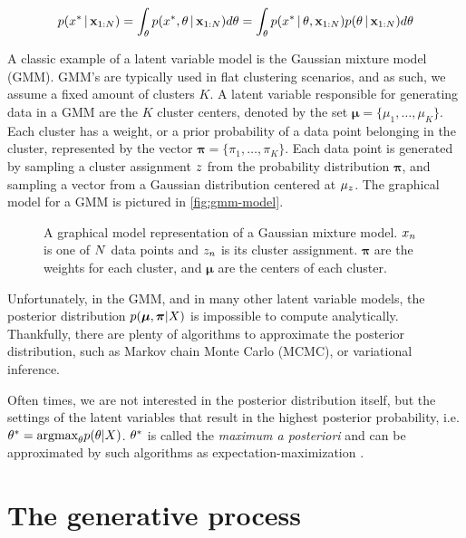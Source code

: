 \begin{align}
  p(x^* \,|\, \mathbf{x}_{1:N}) = \int_\theta p(x^*, \theta \,|\, \mathbf{x}_{1:N})d\theta =  \int_\theta p(x^* \,|\, \theta, \mathbf{x}_{1:N})p(\theta \,|\, \mathbf{x}_{1:N})d\theta
\end{align}


A classic example of a latent variable model
is the Gaussian mixture model (GMM).
GMM's are typically used in flat clustering scenarios,
and as such, we assume a fixed amount of clusters $K$.
A latent variable responsible for generating
data in a GMM are
the $K$ cluster centers, denoted by the set
$\bm{\mu} = \{\mu_1, \ldots, \mu_K\}$.
Each cluster has a weight, or a prior probability
of a data point belonging in the cluster,
represented by the vector $\bm{\pi} = \{\pi_1,\ldots,\pi_K\}$.
Each data point is generated by sampling a cluster
assignment $z$ from the probability distribution $\bm{\pi}$,
and sampling a vector from a Gaussian distribution
centered at $\mu_z$.
The graphical model for a GMM is pictured in \autoref{fig:gmm-model}.

\begin{figure}[H]
  \centering
  
  \caption{A graphical model representation of a Gaussian mixture model. $x_n$ is
  one of $N$ data points and $z_n$ is its cluster assignment. $\bm{\pi}$ are the weights
  for each cluster, and $\bm{\mu}$ are the centers of each cluster.}
\label{fig:gmm-model}
\end{figure}

Unfortunately, in the GMM,
and in many other latent variable models,
the posterior distribution $p(\bm{\mu}, \bm{\pi} | X)$
is impossible to compute analytically.
Thankfully, there are plenty of
algorithms to approximate the posterior distribution,
such as
Markov chain
Monte Carlo (MCMC), or variational
inference.

Often times, we are not interested in the posterior
distribution itself, but the settings of the latent variables
that result in the highest posterior probability, i.e.
$\theta^* = \text{argmax}_\theta p(\theta | X)$.
$\theta^*$ is called the \emph{maximum a posteriori}
and can be approximated 
by such algorithms as
expectation-maximization \citep{Dempster1977}.
\fi

\section{The generative process}

